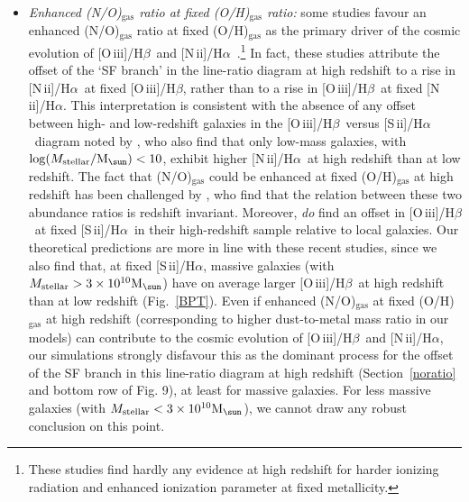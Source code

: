 \documentclass[fleqn,usenatbib]{mnras}
\newcommand{\Msun}{\hbox{M$_\sun$}}
\newcommand{\oiiihb}{\hbox{[O\,{\sc iii}]/H$\beta$}}
\newcommand{\niiha}{\hbox{[N\,{\sc ii}]/H$\alpha$}}
\newcommand{\siiha}{\hbox{[S\,{\sc ii}]/H$\alpha$}}
\begin{document}
\begin{itemize}
\item{\it Enhanced (N/O)$_\mathrm{gas}$ ratio at fixed (O/H)$_\mathrm{gas}$ ratio:}
some studies favour an enhanced (N/O)$_\mathrm{gas}$ ratio at fixed  
(O/H)$_\mathrm{gas}$ as the primary driver of the cosmic evolution of 
\oiiihb\ and \niiha\ \citep{Masters14,Shapley15,Yabe15, Cowie16,
  Masters16, Sanders16}.\footnote{These studies find hardly any
  evidence at high redshift for harder ionizing radiation and enhanced
  ionization parameter  at fixed metallicity.} In fact, these studies
attribute the offset of the  `SF branch' in the line-ratio diagram at
high redshift to a rise in \niiha\ at fixed \oiiihb,  rather than to a
rise in \oiiihb\ at fixed \niiha. This interpretation is consistent
with the absence of any offset between high- and low-redshift galaxies
in the \oiiihb\ versus \siiha\ diagram noted by \citet[from the
analysis of 133 star-forming galaxies at $z \sim 2.3$ with the
Keck/MOSFIRE  spectrometer]{Shapley15}, who also find that only
low-mass galaxies,  with $\log(M_{\rm stellar}/\Msun)<10$, exhibit
higher \niiha\ at high redshift  than at low redshift. The fact that
(N/O)$_\mathrm{gas}$ could be enhanced at fixed (O/H)$_\mathrm{gas}$
at high redshift has been challenged by  \citet{Strom17}, who find
that the relation between these two abundance ratios is redshift
invariant. Moreover, \citet{Kashino17} {\em do} find an offset in
\oiiihb\ at fixed \siiha\ in their high-redshift sample relative to
local galaxies.  Our theoretical predictions are more in line with
these recent studies, since  we also find that, at fixed \siiha,
massive galaxies (with $M_{\rm stellar} >3 \times 10^{10} \Msun$) have
on average larger \oiiihb\ at high redshift than at low redshift
(Fig.~\ref{BPT}). Even if enhanced (N/O)$_\mathrm{gas}$ at fixed
(O/H)$_\mathrm{gas}$ at high redshift (corresponding to higher
dust-to-metal mass ratio in our models) can contribute to the cosmic
evolution of  \oiiihb\ and \niiha, our simulations strongly disfavour
this as the dominant process for the offset of the SF branch in this
line-ratio diagram at high redshift (Section~\ref{noratio} and bottom
row of Fig. 9),  at least for massive galaxies. For less massive
galaxies (with $M_{\rm stellar} <3 \times 10^{10} \Msun$), we cannot
draw any robust conclusion on this point.


\end{itemize}
\end{document}
